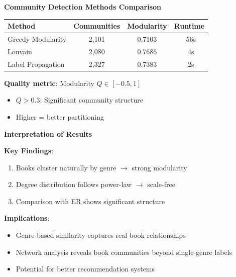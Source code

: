 \documentclass{beamer}
\begin{document}
  \begin{frame}
    \fontsize{10}{12}\selectfont
    \textbf{Community Detection Methods Comparison}
    
    \vspace{0.3cm}
    \begin{table}
      \centering
      \fontsize{10}{12}\selectfont
      \begin{tabular}{lccc}
        \toprule
        Method & Communities & Modularity & Runtime \\
        \midrule
        Greedy Modularity & 2,101 & 0.7103 & ~56s \\
        Louvain & 2,080 & 0.7686 & ~4s \\
        Label Propagation & 2,327 & 0.7383 & ~2s \\
        \bottomrule
      \end{tabular}
    \end{table}
    
    \vspace{0.5cm}
    \textbf{Quality metric}: Modularity $Q \in [-0.5, 1]$
    \begin{itemize}
      \item $Q > 0.3$: Significant community structure
      \item Higher = better partitioning
    \end{itemize}
  \end{frame}

  \begin{frame}
    \fontsize{10}{12}\selectfont
    \textbf{Interpretation of Results}
    
    \vspace{0.5cm}
    \textbf{Key Findings}:
    \begin{enumerate}
      \item Books cluster naturally by genre $\rightarrow$ strong modularity
      \item Degree distribution follows power-law $\rightarrow$ scale-free
      \item Comparison with ER shows significant structure
    \end{enumerate}
    
    \vspace{0.5cm}
    \textbf{Implications}:
    \begin{itemize}
      \item Genre-based similarity captures real book relationships
      \item Network analysis reveals book communities beyond single-genre labels
      \item Potential for better recommendation systems
    \end{itemize}
  \end{frame}
\end{document}
